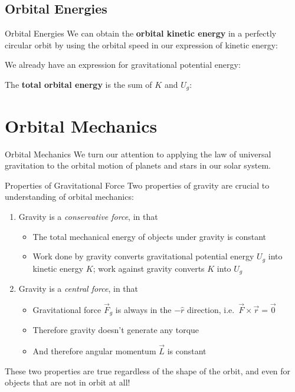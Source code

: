 \documentclass[12pt,compress,aspectratio=169]{beamer}
\begin{document}
\subsection{Orbital Energies}

\begin{frame}{Orbital Energies}
  We can obtain the \textbf{orbital kinetic energy} in a perfectly circular
  orbit by using the orbital speed in our expression of kinetic energy:


  We already have an expression for gravitational potential energy:

  
  The \textbf{total orbital energy} is the sum of $K$ and $U_g$:

\end{frame}



\section{Orbital Mechanics}

\begin{frame}{Orbital Mechanics}
  We turn our attention to applying the law of universal gravitation to the
  orbital motion of planets and stars in our solar system.
\end{frame}



\begin{frame}{Properties of Gravitational Force}
  Two properties of gravity are crucial to understanding of orbital mechanics:
  \begin{enumerate}
  \item Gravity is a \emph{conservative force}, in that
    \begin{itemize}
    \item The total mechanical energy of objects under gravity is constant
    \item Work done by gravity converts gravitational potential energy $U_g$
      into kinetic energy $K$; work against gravity converts $K$ into $U_g$
    \end{itemize}
  \item Gravity is a \emph{central force}, in that
    \begin{itemize}
    \item Gravitational force $\vec F_g$ is always in the $-\hat r$ direction,
      i.e.\ $\vec F\times\vec r=\vec 0$
    \item Therefore gravity doesn't generate any torque
    \item And therefore angular momentum $\vec L$ is constant
    \end{itemize}
  \end{enumerate}
  These two properties are true regardless of the shape of the orbit, and even
  for objects that are not in orbit at all!
\end{frame}
\end{document}
